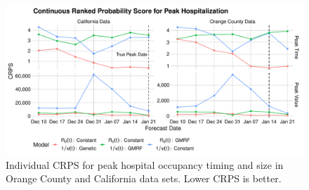 \begin{figure}
    \centering
    \includegraphics[width=1.0\columnwidth]{real_data_peak_crps_plot}
    \caption[Individual CRPS for peak hospital occupancy in real data sets.]{Individual CRPS for peak hospital occupancy timing and size in Orange County and California data sets. Lower CRPS is better.}
    \label{ch_5:fig:real_data_peak_crps_plot}
\end{figure}

\label{ch_5:sec:real_cases_icu_death}